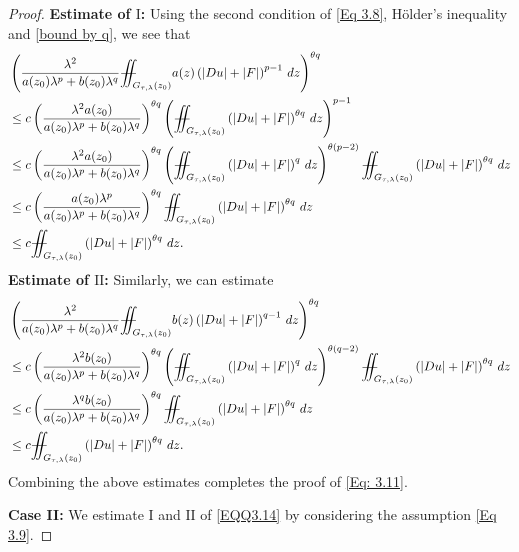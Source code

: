\documentclass[11pt,oneside, english,reqno,twoside a4paper]{amsart}
\theoremstyle{definition}
\numberwithin{theorem}{section}
\numberwithin{equation}{section}
\newcommand{\iintss}{{\int\hspace{-0.28cm}\int}}
\newcommand{ \miints }{{\iintss\hspace{-0.56cm} -\hspace{-0.15cm}-}}
\newcommand{\miint}[1]{{\miints_{\hspace{-0.13cm}#1}}}
\begin{document}
\begin{proof}
\noindent \textbf{Estimate of $\mathrm{I}$:} Using the second condition of \eqref{Eq 3.8}, H\"{o}lder's inequality and \eqref{bound by q}, we see that
\begin{align*}
&\left(\frac{\lambda^2}{a(z_0)\lambda^p+b(z_0)\lambda^q}\miint{G_{\tau, \lambda}(z_0)}a(z)\left(|Du|+|F|\right)^{p-1}\,dz\right)^{\theta q}\\
&\leq c\left(\frac{\lambda^2 a(z_0)}{a(z_0)\lambda^p+b(z_0)\lambda^q}\right)^{\theta q}\left(\miint{G_{\tau, \lambda}(z_0)}\left(|Du|+|F|\right)^{\theta q}\,dz\right)^{p-1}\\
&\leq c \left(\frac{\lambda^2 a(z_0)}{a(z_0)\lambda^p+b(z_0)\lambda^q}\right)^{\theta q}\left(\miint{G_{\tau, \lambda}(z_0)}\left(|Du|+|F|\right)^q\, dz\right)^{\theta(p-2)} \miint{G_{\tau, \lambda}(z_0)}\left(|Du|+|F|\right)^{\theta q}\, dz\\
&\leq c\left(\frac{a(z_0)\lambda^p}{a(z_0)\lambda^p+b(z_0)\lambda^q}\right)^{\theta q} \miint{G_{\tau, \lambda}(z_0)}\left(|Du|+|F|\right)^{\theta q}\, dz \\
&\leq c \miint{G_{\tau, \lambda}(z_0)}\left(|Du|+|F|\right)^{\theta q}\, dz.
\end{align*}
\textbf{Estimate of $\mathrm{II}$:} Similarly, we can estimate
\begin{align*}
&\left(\frac{\lambda^2}{a(z_0)\lambda^p+b(z_0)\lambda^q}\miint{G_{\tau, \lambda}(z_0)}b(z)\left(|Du|+|F|\right)^{q-1}\,dz\right)^{\theta q}\\
&\leq c\left(\frac{\lambda^2 b(z_0)}{a(z_0)\lambda^p+b(z_0)\lambda^q}\right)^{\theta q}\left(\miint{G_{\tau, \lambda}(z_0)}\left(|Du|+|F|\right)^q\,dz\right)^{\theta (q-2)} \miint{G_{\tau, \lambda}(z_0)}\left(|Du|+|F|\right)^{\theta q}\,dz\\
&\leq c \left(\frac{\lambda^q b(z_0)}{a(z_0)\lambda^p+b(z_0)\lambda^q}\right)^{\theta q} \miint{G_{\tau, \lambda}(z_0)}\left(|Du|+|F|\right)^{\theta q}\,dz\\
&\leq c \miint{G_{\tau, \lambda}(z_0)}\left(|Du|+|F|\right)^{\theta q}\,dz.
\end{align*}
Combining the above estimates completes the proof of \eqref{Eq: 3.11}.



\noindent \textbf{Case II:} We estimate $\mathrm{I}$ and $\mathrm{II}$ of \eqref{EQQ3.14} by considering the assumption \eqref{Eq 3.9}.


\end{proof}
\end{document}
